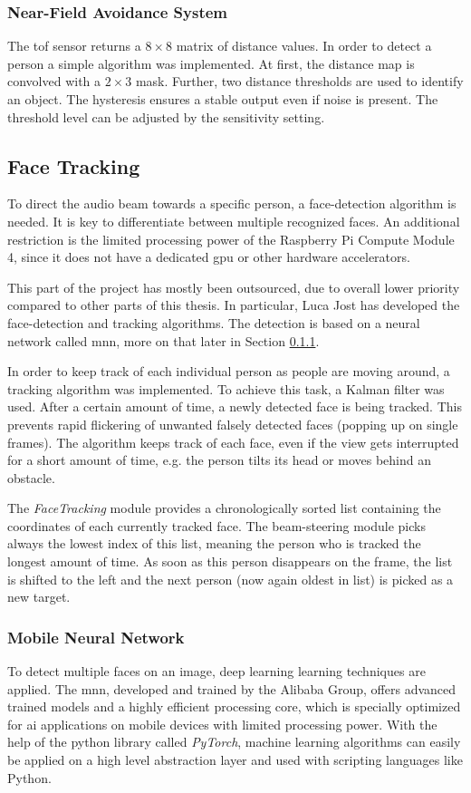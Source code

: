 \subsubsection{Near-Field Avoidance System} \label{4_Sensors_Near-field}
The \acrshort{tof} sensor returns a $8 \times 8$ matrix of distance values. In order to detect a person a simple algorithm was implemented. At first, the distance map is convolved with a $2 \times 3$ mask. Further, two distance thresholds are used to identify an object. The hysteresis ensures a stable output even if noise is present. The threshold level can be adjusted by the sensitivity setting.

\subsection{Face Tracking}
To direct the audio beam towards a specific person, a face-detection algorithm is needed. It is key to differentiate between multiple recognized faces. An additional restriction is the limited processing power of the Raspberry Pi Compute Module 4, since it does not have a dedicated \acrfull{gpu} or other hardware accelerators.

This part of the project has mostly been outsourced, due to overall lower priority compared to other parts of this thesis. In particular, Luca Jost has developed the face-detection and tracking algorithms. The detection is based on a neural network called \acrshort{mnn}, more on that later in Section \ref{software_mnn}.

In order to keep track of each individual person as people are moving around, a tracking algorithm was implemented. To achieve this task, a Kalman filter was used. After a certain amount of time, a newly detected face is being tracked. This prevents rapid flickering of unwanted falsely detected faces (popping up on single frames). The algorithm keeps track of each face, even if the view gets interrupted for a short amount of time, e.g. the person tilts its head or moves behind an obstacle.

The \textit{FaceTracking} module provides a chronologically sorted list containing the coordinates of each currently tracked face. The beam-steering module picks always the lowest index of this list, meaning the person who is tracked the longest amount of time. As soon as this person disappears on the frame, the list is shifted to the left and the next person (now again oldest in list) is picked as a new target.

\subsubsection{Mobile Neural Network}\label{software_mnn}
To detect multiple faces on an image, deep learning learning techniques are applied. The \acrfull{mnn}, developed and trained by the Alibaba Group, offers advanced trained models and a highly efficient processing core, which is specially optimized for \acrshort{ai} applications on mobile devices with limited processing power. With the help of the python library called \mbox{\textit{PyTorch}}, machine learning algorithms can easily be applied on a high level abstraction layer and used with scripting languages like Python.

